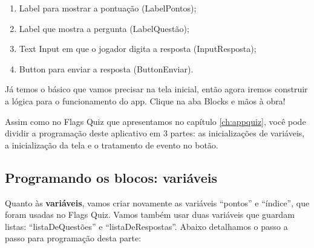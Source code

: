 \documentclass[11pt,fleqn]{book} %
\begin{document}
\begin{enumerate}
\item Label para mostrar a pontuação (LabelPontos);
\item Label que mostra a pergunta (LabelQuestão);
\item Text Input em que o jogador digita a resposta (InputResposta);
\item Button para enviar a resposta (ButtonEnviar).
\end{enumerate}

Já temos o básico que vamos precisar na tela inicial, então agora iremos construir a lógica para o funcionamento do app. Clique na aba Blocks e mãos à obra!

Assim como no Flags Quiz que apresentamos no capítulo \ref{ch:appquiz}, você pode dividir a programação deste aplicativo em 3 partes: as inicializações de variáveis, a inicialização da tela e o tratamento de evento no botão.

\subsection{Programando os blocos: variáveis}


Quanto às \textbf{variáveis}, vamos criar novamente as variáveis ``pontos'' e ``índice'', que foram usadas no Flags Quiz. Vamos também usar duas variáveis que guardam listas: ``listaDeQuestões'' e ``listaDeRespostas''. Abaixo detalhamos o passo a passo para programação desta parte:
\end{document}
